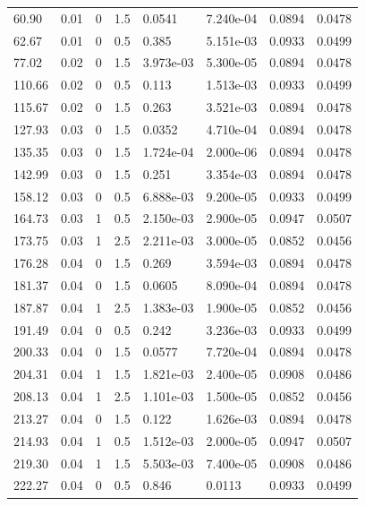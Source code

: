 \documentclass[preview]{standalone}
\begin{document}
{{\begin{tabular}{L{1.2cm}C{1.2cm} C{0.3cm}C{0.5cm} C{1.4cm}C{1.4cm} C{1.4cm}C{1.4cm}}
  60.90  &  0.01  & 0     & 1.5 &  0.0541  & 7.240e-04  & 0.0894 &  0.0478   \\ 
  62.67  &  0.01  & 0     & 0.5 &  0.385  & 5.151e-03  & 0.0933 &  0.0499   \\ 
  77.02  &  0.02  & 0     & 1.5 &  3.973e-03  & 5.300e-05  & 0.0894 &  0.0478   \\ 
  110.66  &  0.02  & 0     & 0.5 &  0.113  & 1.513e-03  & 0.0933 &  0.0499   \\ 
  115.67  &  0.02  & 0     & 1.5 &  0.263  & 3.521e-03  & 0.0894 &  0.0478   \\ 
  127.93  &  0.03  & 0     & 1.5 &  0.0352  & 4.710e-04  & 0.0894 &  0.0478   \\ 
  135.35  &  0.03  & 0     & 1.5 &  1.724e-04  & 2.000e-06  & 0.0894 &  0.0478   \\ 
  142.99  &  0.03  & 0     & 1.5 &  0.251  & 3.354e-03  & 0.0894 &  0.0478   \\ 
  158.12  &  0.03  & 0     & 0.5 &  6.888e-03  & 9.200e-05  & 0.0933 &  0.0499   \\ 
  164.73  &  0.03  & 1     & 0.5 &  2.150e-03  & 2.900e-05  & 0.0947 &  0.0507   \\ 
  173.75  &  0.03  & 1     & 2.5 &  2.211e-03  & 3.000e-05  & 0.0852 &  0.0456   \\ 
  176.28  &  0.04  & 0     & 1.5 &  0.269  & 3.594e-03  & 0.0894 &  0.0478   \\ 
  181.37  &  0.04  & 0     & 1.5 &  0.0605  & 8.090e-04  & 0.0894 &  0.0478   \\ 
  187.87  &  0.04  & 1     & 2.5 &  1.383e-03  & 1.900e-05  & 0.0852 &  0.0456   \\ 
  191.49  &  0.04  & 0     & 0.5 &  0.242  & 3.236e-03  & 0.0933 &  0.0499   \\ 
  200.33  &  0.04  & 0     & 1.5 &  0.0577  & 7.720e-04  & 0.0894 &  0.0478   \\ 
  204.31  &  0.04  & 1     & 1.5 &  1.821e-03  & 2.400e-05  & 0.0908 &  0.0486   \\ 
  208.13  &  0.04  & 1     & 2.5 &  1.101e-03  & 1.500e-05  & 0.0852 &  0.0456   \\ 
  213.27  &  0.04  & 0     & 1.5 &  0.122  & 1.626e-03  & 0.0894 &  0.0478   \\ 
  214.93  &  0.04  & 1     & 0.5 &  1.512e-03  & 2.000e-05  & 0.0947 &  0.0507   \\ 
  219.30  &  0.04  & 1     & 1.5 &  5.503e-03  & 7.400e-05  & 0.0908 &  0.0486   \\ 
  222.27  &  0.04  & 0     & 0.5 &  0.846  & 0.0113  & 0.0933 &  0.0499   \\ 

\end{tabular}}}
\end{document}
